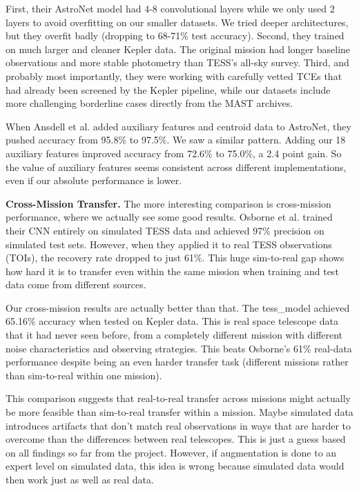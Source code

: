 \documentclass[letterpaper]{article} %
\begin{document}
First, their AstroNet model had 4-8 convolutional layers while we only used 2 layers to avoid overfitting on our smaller datasets. We tried deeper architectures, but they overfit badly (dropping to 68-71\% test accuracy). Second, they trained on much larger and cleaner Kepler data. The original mission had longer baseline observations and more stable photometry than TESS's all-sky survey. Third, and probably most importantly, they were working with carefully vetted TCEs that had already been screened by the Kepler pipeline, while our datasets include more challenging borderline cases directly from the MAST archives.

When Ansdell et al. added auxiliary features and centroid data to AstroNet, they pushed accuracy from 95.8\% to 97.5\%. We saw a similar pattern. Adding our 18 auxiliary features improved accuracy from 72.6\% to 75.0\%, a 2.4 point gain. So the value of auxiliary features seems consistent across different implementations, even if our absolute performance is lower.

\textbf{Cross-Mission Transfer.} The more interesting comparison is cross-mission performance, where we actually see some good results. Osborne et al. trained their CNN entirely on simulated TESS data and achieved 97\% precision on simulated test sets. However, when they applied it to real TESS observations (TOIs), the recovery rate dropped to just 61\%. This huge sim-to-real gap shows how hard it is to transfer even within the same mission when training and test data come from different sources.

Our cross-mission results are actually better than that. The tess\_model achieved 65.16\% accuracy when tested on Kepler data. This is real space telescope data that it had never seen before, from a completely different mission with different noise characteristics and observing strategies. This beats Osborne's 61\% real-data performance despite being an even harder transfer task (different missions rather than sim-to-real within one mission).

This comparison suggests that real-to-real transfer across missions might actually be more feasible than sim-to-real transfer within a mission. Maybe simulated data introduces artifacts that don't match real observations in ways that are harder to overcome than the differences between real telescopes. This is just a guess based on all findings so far from the project. However, if augmentation is done to an expert level on simulated data, this idea is wrong because simulated data would then work just as well as real data.
\end{document}
